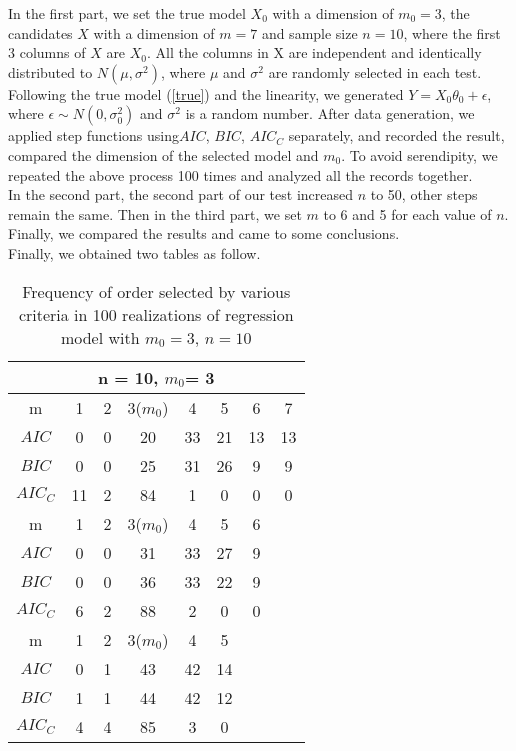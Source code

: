 In the first part, we set the true model $X_0$ with a dimension of $m_0 = 3$, the candidates $X$ with a dimension of $m= 7$ and sample size $n = 10$, where the first 3 columns of $X$ are $X_0$. All the columns in X are independent and identically distributed to $N(\mu, \sigma^2)$, where $\mu$ and $\sigma^2$ are randomly selected in each test. Following the true model (\ref{true}) and the linearity, we generated $Y =X_0\theta_0 + \epsilon$, where $\epsilon \sim N(0, \sigma_0^2)$ and $\sigma^2$ is a random number. 
After data generation, we applied step functions using$ AIC$, $BIC$, $AIC_C$ separately, and recorded the result, compared the dimension of the selected model and $m_0$. 
To avoid serendipity, we repeated the above process 100 times and analyzed all the records together.\\ 
In the second part, the second part of our test increased $n$ to 50, other steps remain the same. Then in the third part, we set $m$ to 6 and 5 for each value of $n$. Finally, we compared the results and came to some conclusions.\\
Finally, we obtained two tables as follow.\\
\begin{table}[!h]
\begin{center}
\begin{tabular}{ c | c c c c c c c}
\hline
 \multicolumn{8}{c}{n = 10, $m_0$= 3} \\
 \hline
    m  & 1 & 2 & 3($m_0$) & 4 & 5 & 6 & 7\\
    \hline
 $AIC$ & 0 & 0 & 20 & 33 & 21 & 13 &13\\ 
 $BIC$ & 0 & 0 & 25 & 31 & 26 & 9 & 9\\ 
 $AIC_C$ & 11 & 2 & 84 & 1 & 0 & 0 & 0 \\
  \hline
    m  & 1 & 2 & 3($m_0$) & 4 & 5 & 6 & \\
    \hline
 $AIC$ & 0 & 0 & 31 & 33 & 27 & 9 &\\ 
 $BIC$ & 0 & 0 & 36 & 33 & 22 & 9 & \\ 
 $AIC_C$ & 6 & 2 & 88 & 2 & 0 & 0 &  \\
  \hline
    m  & 1 & 2 & 3($m_0$) & 4 & 5 &  & \\
    \hline
 $AIC$ & 0 & 1 & 43 & 42 & 14 &  &\\ 
 $BIC$ & 1 & 1 & 44 & 42 & 12 & & \\ 
 $AIC_C$ & 4 & 4 & 85 & 3 & 0 &  &  
\end{tabular}
\caption{\label{t1}Frequency of order selected by various criteria in 100 realizations of regression model with $m_0 = 3$, $n=10$}
\end{center}
\end{table}

